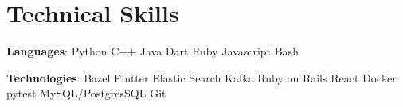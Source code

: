 \documentclass[]{Klement_Resume}
\begin{document}
\begin{minipage}[t]{1\textwidth}
  \section{Technical Skills} 
  \vspace{\topsep} %
  \begin{tightemize}
    \item {\bf Languages}: Python \textbullet{} C++ \textbullet{} Java \textbullet{} Dart \textbullet{} Ruby \textbullet{} Javascript \textbullet{} Bash
    \item {\bf Technologies}: Bazel \textbullet{} Flutter \textbullet{} Elastic Search \textbullet{} Kafka \textbullet{} Ruby on Rails \textbullet{} React \textbullet{} Docker \textbullet{} pytest \textbullet{} MySQL/PostgresSQL \textbullet{} Git
    \end{tightemize}

  \end{minipage} 
  
\end{document}
